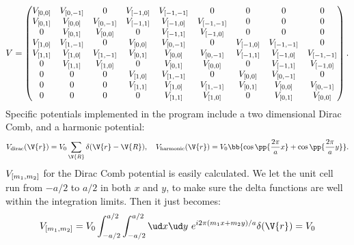 \documentclass[main.tex]{subfiles}
\begin{document}
	\begin{equation}\label{key}
		V = \begin{pmatrix}
			V_{[0, 0]}	& V_{[0, -1]}	& 0				& V_{[-1, 0]}		& V_{[-1, -1]}	& 0					& 0				& 0					& 0 \\
			
			V_{[0, 1]}	& V_{[0, 0]}	& V_{[0, -1]}	& V_{[-1, 1]}		& V_{[-1, 0]}		& V_{[-1, -1]}	& 0 			& 0 				& 0 \\
			
			0				& V_{[0, 1]}	& V_{[0, 0]}	& 0					& V_{[-1, 1]} 	& V_{[-1, 0]}		& 0				& 0					& 0 \\
			
			V_{[1, 0]}	& V_{[1, -1]}	& 0				& V_{[0, 0]}		& V_{[0, -1]}		& 0					& V_{[-1, 0]}	& V_{[-1, -1]}	& 0 \\
			
			V_{[1, 1]} 	& V_{[1, 0]}	& V_{[1, -1]}	& V_{[0, 1]}		& V_{[0, 0]}		& V_{[0,-1]}		& V_{[-1, 1]}	& V_{[-1, 0]}		& V_{[-1, -1]} \\
			
			0				& V_{[1, 1]}	& V_{[1, 0]}	& 0					& V_{[0,1]}		& V_{[0, 0]}		& 0				& V_{[-1, 1]}		& V_{[-1, 0]} \\
			
			0				& 0				& 0				& V_{[1, 0]}		& V_{[1, -1]}		& 0					& V_{[0, 0]}	& V_{[0, -1]}		& 0 \\
			
			0				& 0				& 0				& V_{[1, 1]}		& V_{[1, 0]}		& V_{[1, -1]}		& V_{[0, 1]}	& V_{[0, 0]}		& V_{[0, -1]} \\
			
			0 				& 0				& 0				& 0					& V_{[1, 1]}		& V_{[1, 0]}		& 0				& V_{[0, 1]}		& V_{[0, 0]}
		\end{pmatrix}.
	\end{equation}
	Specific potentials implemented in the program include a two dimensional Dirac Comb, and a harmonic potential:
	\begin{equation}\label{key}
		V_{\text{dirac}}(\V{r}) = V_0 \sum_{\V{R}} \delta(\V{r}-\V{R}), \quad V_{\text{harmonic}}(\V{r}) = V_0 \bb{\cos\pp{\frac{2\pi}{a} x} + \cos\pp{\frac{2\pi}{a} y}}.
	\end{equation}
	$ V_{[m_1, m_2]} $ for the Dirac Comb potential is easily calculated. We let the unit cell run from $ -a/2 $ to $ a/2 $ in both $ x $ and $ y $, to make sure the delta functions are well within the integration limits. Then it just becomes:
	\begin{equation}\label{key}
		V\coef{m_1, m_2} = V_0 \int_{-a/2}^{a/2} \int_{-a/2}^{a/2} \ud x \ud y \ e^{i 2\pi (m_1 x + m_2 y)/a} \delta(\V{r}) = V_0
	\end{equation}
\end{document}
